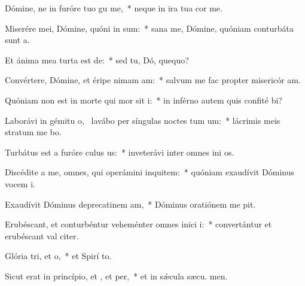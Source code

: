 \item Dómine, ne in furóre tuo gu me,~* neque in ira tua cor me.
\item Miserére mei, Dómine, quóni in sum:~* sana me, Dómine, quóniam conturbáta sunt  a.
\item Et ánima mea turta est de:~* sed tu, Dó, quequo?
\item Convértere, Dómine, et éripe nimam am:~* salvum me fac propter misericór am.
\item Quóniam non est in morte qui mor sit i:~* in inférno autem quis confité bi?
\item Laborávi in gémitu o,~\pscross{} lavábo per síngulas noctes tum um:~* lácrimis meis stratum me bo.
\item Turbátus est a furóre culus us:~* inveterávi inter omnes ini os.
\item Discédite a me, omnes, qui operámini inquitem:~* quóniam exaudívit Dóminus vocem  i.
\item Exaudívit Dóminus deprecatinem am,~* Dóminus oratiónem me pit.
\item Erubéscant, et conturbéntur veheménter omnes inici i:~* convertántur et erubéscant val citer.
\item Glória tri, et o,~* et Spirí to.
\item Sicut erat in princípio, et , et per,~* et in sǽcula sæcu. men.
